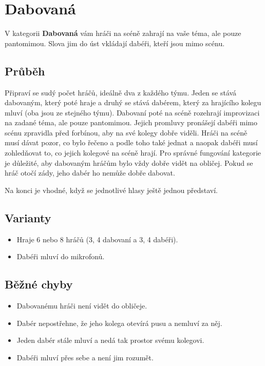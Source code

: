 \documentclass[main.tex]{subfiles}
\begin{document}
 
 
 
 
\needspace{5cm} \section{Dabovaná} \label{dabovaná}  
 
 
V kategorii \textbf{Dabovaná}{} vám hráči na scéně zahrají na vaše téma, ale pouze pantomimou. Slova jim do úst vkládají dabéři, kteří jsou mimo scénu. 
 
 
\subsection{Průběh} Připraví se sudý počet hráčů, ideálně dva z každého týmu. Jeden se stává dabovaným, který poté hraje a druhý se stává dabérem, který za hrajícího kolegu mluví (oba jsou ze stejného týmu).  
Dabovaní poté na scéně rozehrají improvizaci na zadané téma, ale pouze pantomimou. Jejich promluvy pronášejí dabéři mimo scénu zpravidla před forbínou, aby na své kolegy dobře viděli. Hráči na scéně musí dávat pozor, co bylo řečeno a podle toho také jednat a naopak dabéři musí zohledňovat to, co jejich kolegové na scéně hrají. Pro správné fungování kategorie je důležité, aby dabovaným hráčům bylo vždy dobře vidět na obličej. Pokud se hráč otočí zády, jeho dabér ho nemůže dobře dabovat. 
 
Na konci je vhodné, když se jednotlivé hlasy ještě jednou představí. 
 
\subsection{ Varianty } \begin{itemize}
\item Hraje 6 nebo 8 hráčů (3, 4 dabovaní a 3, 4 dabéři).
\item Dabéři mluví do mikrofonů.
\end{itemize}
 
\subsection{ Běžné chyby } \begin{itemize}
\item Dabovanému hráči není vidět do obličeje.
\item Dabér nepostřehne, že jeho kolega otevírá pusu a nemluví za něj.
\item Jeden dabér stále mluví a nedá tak prostor svému kolegovi.
\item Dabéři mluví přes sebe a není jim rozumět.
\end{itemize}
 
\end{document}
